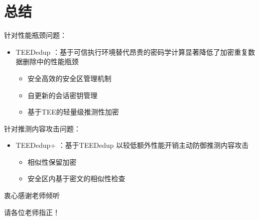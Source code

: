 \documentclass{beamer}
\newcommand{\sysnameS}{TEEDedup }
\newcommand{\prototype}{TEEDedup+ }
\begin{document}
\section{总结}

\begin{frame}{}
    \begin{textbox}{针对性能瓶颈问题：}
        \begin{itemize}
            \item \sysnameS ：基于可信执行环境替代昂贵的密码学计算显著降低了加密重复数据删除中的性能瓶颈
                  \begin{itemize}
                      \item 安全高效的安全区管理机制
                      \item 自更新的会话密钥管理
                      \item 基于TEE的轻量级推测性加密
                  \end{itemize}
        \end{itemize}
    \end{textbox}
    \begin{textbox}{针对推测内容攻击问题：}
        \begin{itemize}
            \item \prototype ：基于\sysnameS 以较低额外性能开销主动防御推测内容攻击
                  \begin{itemize}
                      \item 相似性保留加密
                      \item 安全区内基于密文的相似性检查
                  \end{itemize}
        \end{itemize}
    \end{textbox}
\end{frame}

\begin{frame}
    \begin{center}
        {\Huge 衷心感谢老师倾听}

        {\Huge 请各位老师指正！}
    \end{center}
\end{frame}
\end{document}
